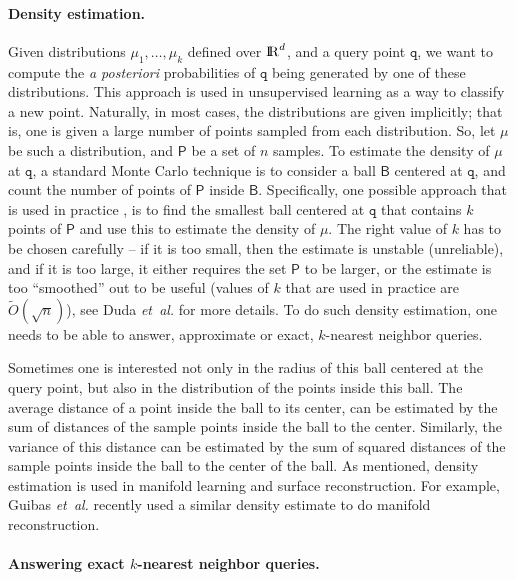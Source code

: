 \documentclass[12pt]{article}
\theoremstyle{remark}{\theorembodyfont{\rm} \newtheorem{remark}[theorem]{Remark}}
\newcommand{\etal}{\textit{et~al.}\xspace}
\renewcommand{\Re}{{\rm I\!\hspace{-0.025em} R}}
\newcommand{\PntSet}{\mathsf{P}}
\newcommand{\query}{\mathtt{q}}
\newcommand{\BallA}{\mathsf{B}}
\newcommand{\Otilde}{\widetilde{O}}
\begin{document}
\paragraph{Density estimation.}
Given distributions $\mu_1, \ldots, \mu_k$ defined over $\Re^d$, and a
query point $\query$, we want to compute the \emph{a
   posteriori} probabilities of $\query$ being generated by one of
these distributions. This approach is used in unsupervised learning as
a way to classify a new point. Naturally, in most cases, the
distributions are given implicitly; that is, one is given a large
number of points sampled from each distribution. So, let $\mu$ be such
a distribution, and $\PntSet$ be a set of $n$ samples. To estimate the
density of $\mu$ at $\query$, a standard Monte Carlo technique is to
consider a ball $\BallA$ centered at $\query$, and count the number of
points of $\PntSet$ inside $\BallA$.  Specifically, one possible
approach that is used in practice \cite{dhs-pc-01}, is to find the
smallest ball centered at $\query$ that contains $k$ points of
$\PntSet$ and use this to estimate the density of $\mu$.  The
right value of $k$ has to be chosen carefully -- if it is too small,
then the estimate is unstable (unreliable), and if it is too large, it
either requires the set $\PntSet$ to be larger, or the estimate is too
``smoothed'' out to be useful (values of $k$ that are used in practice
are $\Otilde(\sqrt{n})$), see Duda \etal \cite{dhs-pc-01} for more
details. To do such density estimation, one needs to be able to answer,
approximate or exact, $k$-nearest neighbor queries.

Sometimes one is interested not only in the radius of this ball
centered at the query point, but also in the distribution of the
points inside this ball. The average distance of a point inside the
ball to its center, can be estimated by the sum of distances of the sample
points inside the ball to the center. Similarly, the variance of this
distance can be estimated by the sum of squared distances of the
sample points inside the ball to the center of the ball.  As mentioned, 
density estimation is used in manifold learning and surface
reconstruction. For example, Guibas \etal \cite{gmm-wkd-11} recently
used a similar density estimate to do manifold reconstruction.


\paragraph{Answering exact $k$-nearest neighbor queries.}
\end{document}
